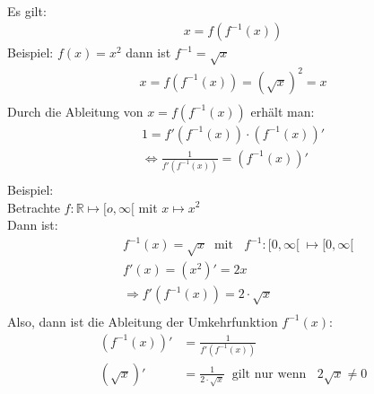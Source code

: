 \begin{center}
	\\	
\end{center}
Es gilt:\\
\begin{align*}
x=f(f^{-1}(x))
\end{align*}
Beispiel: $ f(x)=x^2 $ dann ist $ f^{-1}=\sqrt{x} $\\
\begin{align*}
x=f(f^{-1}(x))=(\sqrt{x})^2=x\\
\end{align*}
Durch die  Ableitung von $ x=f(f^{-1}(x)) $ erhält man:\\
\begin{align*}
1=f'(f^{-1}(x))\cdot (f^{-1}(x))'\\
\Leftrightarrow \frac{1}{f'(f^{-1}(x))}=(f^{-1}(x))'\\
\end{align*}
Beispiel:\\
Betrachte $ f:\mathbb{R}\longmapsto [o,\infty[ $ mit $ x\longmapsto x^2 $\\
Dann ist:\\
\begin{align*}
&f^{-1}(x)=\sqrt{x}\;\;\text{mit }\;\;f^{-1}:[0,\infty[\;\longmapsto [0,\infty[\\
&f'(x)=(x^2)'=2x\\
&\Rightarrow f'(f^{-1}(x))=2\cdot \sqrt{x}\\
\end{align*}
Also, dann ist die Ableitung der Umkehrfunktion $ f^{-1}(x) $:\\
\begin{align*}
(f^{-1}(x))'&=\frac{1}{f'(f^{-1}(x))}\\
(\sqrt{x})'&=\frac{1}{2\cdot \sqrt{x}}\;\;\text{gilt nur wenn }\;\;2\sqrt{x}\neq 0\\
\end{align*}
\newpage
\noindent
